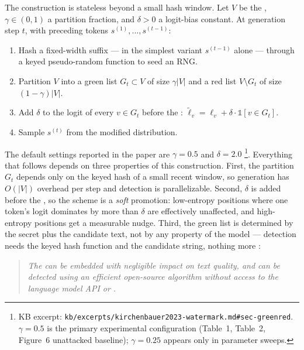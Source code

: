 The construction is stateless beyond a small hash window. Let $V$ be
the , $\gamma \in (0, 1)$ a partition fraction, and
$\delta > 0$ a logit-bias constant. At generation step $t$, with
preceding tokens $s^{(1)}, \ldots, s^{(t-1)}$:

\begin{enumerate}
\item Hash a fixed-width suffix --- in the simplest variant
$s^{(t-1)}$ alone --- through a keyed pseudo-random function to seed
an RNG.
\item Partition $V$ into a green list $G_t \subset V$ of size
$\gamma|V|$ and a red list $V \setminus G_t$ of size
$(1 - \gamma)|V|$.
\item Add $\delta$ to the logit of every $v \in G_t$ before the
: $\tilde{\ell}_v = \ell_v + \delta \cdot \mathbb{1}[v \in G_t]$.
\item Sample $s^{(t)}$ from the modified distribution.
\end{enumerate}

The default settings reported in the paper are $\gamma = 0.5$ and
$\delta = 2.0$%
\footnote{KB excerpt: \nolinkurl{kb/excerpts/kirchenbauer2023-watermark.md#sec-greenred}.
$\gamma = 0.5$ is the primary experimental configuration (Table~1, Table~2,
Figure~6 unattacked baseline); $\gamma = 0.25$ appears only in parameter sweeps.}.
Everything that follows depends on three properties of this
construction. First, the partition $G_t$ depends only on the keyed hash
of a small recent window, so generation has $O(|V|)$ overhead per step
and detection is parallelizable. Second, $\delta$ is added before the
, so the scheme is a \emph{soft} promotion: low-entropy positions
where one token's logit dominates by more than $\delta$ are effectively
unaffected, and high-entropy positions get a measurable nudge. Third,
the green list is determined by the secret  plus the candidate text,
not by any property of the model --- detection needs the keyed hash
function and the candidate string, nothing more
\citep[\S{}abstract]{kirchenbauer2023-watermark}:

\begin{quote}\itshape
The  can be embedded with negligible impact on text quality,
and can be detected using an efficient open-source algorithm without
access to the language model API or .
\end{quote}

